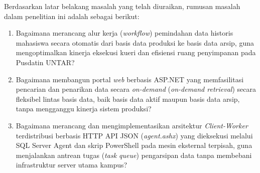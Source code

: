 Berdasarkan latar belakang masalah yang telah diuraikan, rumusan masalah dalam penelitian ini adalah sebagai berikut:
\begin{enumerate}
    \item Bagaimana merancang alur kerja (\textit{workflow}) pemindahan data historis mahasiswa secara otomatis dari basis data produksi ke basis data arsip, guna mengoptimalkan kinerja eksekusi kueri dan efisiensi ruang penyimpanan pada Pusdatin UNTAR?

    \item Bagaimana membangun portal \textit{web} berbasis ASP.NET yang memfasilitasi pencarian dan penarikan data secara \textit{on-demand} (\textit{on-demand retrieval}) secara fleksibel lintas basis data, baik basis data aktif maupun basis data arsip, tanpa mengganggu kinerja sistem produksi?

    \item Bagaimana merancang dan mengimplementasikan arsitektur \textit{Client-Worker} terdistribusi berbasis HTTP API JSON (\textit{agent.ashx}) yang dieksekusi melalui SQL Server Agent dan skrip PowerShell pada mesin eksternal terpisah, guna menjalankan antrean tugas (\textit{task queue}) pengarsipan data tanpa membebani infrastruktur server utama kampus?
\end{enumerate}
